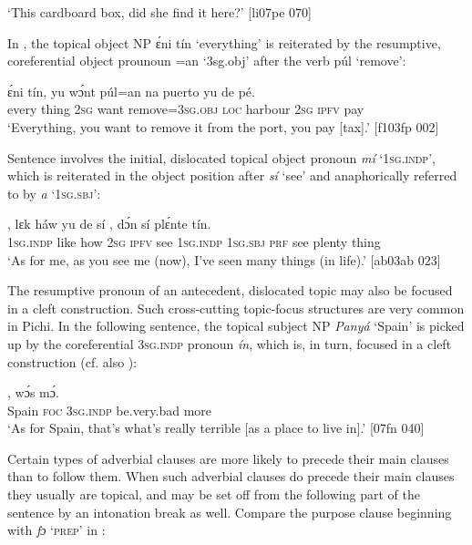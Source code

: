 \glt ‘This cardboard box, did she find it here?’ [li07pe 070]
\z

In , the topical object NP ɛ́ni tín ‘everything’ is reiterated by the resumptive, coreferential object prounoun =an ‘3sg.obj’ after the verb púl ‘remove’:


\ea%
    \label{ex:key:751}
    \gll ɛ́ni    tín,    yu  wɔ́nt  púl=an 
na  puerto  yu  de  pé. \\
every  thing  \textsc{2sg}  want  remove=\textsc{3sg.obj} 
\textsc{loc}  harbour  \textsc{2sg}  \textsc{ipfv}  pay\\

\glt ‘Everything, you want to remove it from the port, you pay [tax].’ [f103fp 002]
\z

Sentence  involves the initial, dislocated topical object pronoun \textit{mí} ‘\textsc{1sg.indp}’, which is reiterated in the object position after \textit{sí} ‘see’ and anaphorically referred to by \textit{a} ‘\textsc{1sg.sbj}’: 


\ea%
    \label{ex:key:752}
    \gll {},    lɛk  háw    yu  de  sí  ,        dɔ́n  
sí  plɛ́nte  tín.\\
\textsc{1sg.indp}  like  how    \textsc{2sg}  \textsc{ipfv}  see  \textsc{1sg.indp}  \textsc{1sg.sbj}  \textsc{prf}   
see  plenty  thing \\

\glt ‘As for me, as you see me (now), I’ve seen many things (in life).’ [ab03ab 023]
\z

The resumptive pronoun of an antecedent, dislocated topic may also be focused in a cleft construction. Such cross-cutting topic-focus structures are very common in Pichi. In the following sentence, the topical subject \textsc{NP} \textit{Panyá} ‘Spain’ is picked up by the coreferential \textsc{3sg.indp} pronoun \textit{ín}, which is, in turn, focused in a cleft construction (cf. also ):


\ea%
    \label{ex:key:753}
    \gll {},        wɔ́s      mɔ́.\\
Spain  \textsc{foc}  \textsc{3sg.indp}  be.very.bad  more\\

\glt ‘As for Spain, that’s what’s really terrible [as a place to live in].’ [07fn 040]
\z

Certain types of adverbial clauses are more likely to precede their main clauses than to follow them. When such adverbial clauses do precede their main clauses they usually are topical, and may be set off from the following part of the sentence by an intonation break as well. Compare the purpose clause beginning with \textit{fɔ} ‘\textsc{prep’} in :


